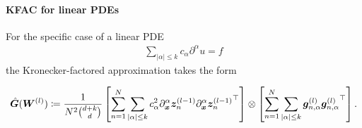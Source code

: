 \paragraph{KFAC for linear PDEs}

For the specific case of a linear PDE 
\begin{align}
    \sum_{\lvert \alpha \rvert\le k} c_\alpha \partial^\alpha u = f
\end{align}
the Kronecker-factored approximation takes the form 
\begin{tcolorbox}[colframe=kfac, title={KFAC for ENGD for a general linear PDE},bottom=0mm,top=0mm,middle=0mm]
\begin{align*}\label{eq:KFAC-PINNs-general}
    \hat{\mG}%
    (\mW^{(l)})
    \coloneqq \frac{1}{N^2 \binom{d+k}{d}}
    \left[\sum_{n=1}^N \sum_{\lvert \alpha \rvert \le k} %
    c_\alpha^2\partial_\vx^\alpha \vz_n^{(l-1)} {\partial_\vx^\alpha \vz_n^{(l-1)}}^\top\right] 
    \otimes
    \left[\sum_{n=1}^N\sum_{\lvert \alpha \rvert \le k} \vg^{(l)}_{n,\alpha} {\vg^{(l)}_{n,\alpha}}^\top \right]. 
\end{align*}
\end{tcolorbox}

